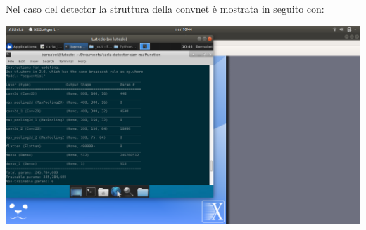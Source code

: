 \documentclass[14pt]{extarticle}
\begin{document}

Nel caso del detector la struttura della convnet è  mostrata in seguito con:

\includegraphics[scale=0.3]{strutturarete.png}
\end{document}
